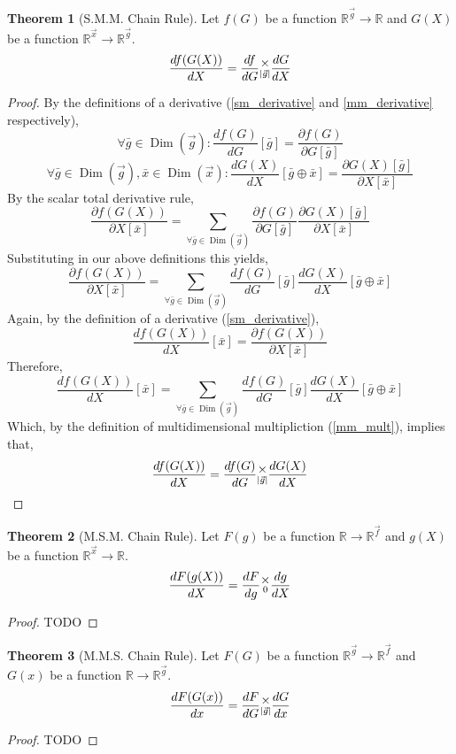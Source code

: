 \documentclass[12pt]{article}
\theoremstyle{definition}
\newtheorem{theorem}{Theorem}[section]
\theoremstyle{case}
\theoremstyle{ppart}
\DeclareMathOperator{\Dim}{Dim}
\newcommand{\mmult}[1]{\text{\raisebox{1ex}{$\underset{#1}{\times}$}}}
\begin{document}
\begin{theorem}[S.M.M. Chain Rule]
\label{smm_chain_rule}
Let $f(G)$ be a function $\mathbb{R}^{\vec{g}} \rightarrow \mathbb{R}$
and $G(X)$ be a function $\mathbb{R}^{\vec{x}} \rightarrow \mathbb{R}^{\vec{g}}$.
\[
\frac{df(G(X))}{dX} = \frac{df}{dG} \mmult{|\vec{g}|} \frac{dG}{dX}
\]
\end{theorem}
\begin{proof}
By the definitions of a derivative
(\ref{sm_derivative} and \ref{mm_derivative} respectively),
\[
\forall \bar{g} \in \Dim(\vec{g}):
\frac{df(G)}{dG}[\bar{g}]
= \frac{\partial f(G)}{\partial G[\bar{g}]}
\]
\[
\forall \bar{g} \in \Dim(\vec{g}), \bar{x} \in \Dim(\vec{x}):
\frac{dG(X)}{dX}[\bar{g} \oplus \bar{x}]
= \frac{\partial G(X)[\bar{g}]}{\partial X[\bar{x}]}
\]
By the scalar total derivative rule,
\[
\frac{\partial f(G(X))}{\partial X[\bar{x}]}
= \sum_{\forall \bar{g} \in \Dim(\vec{g})} 
\frac{\partial f(G)}{\partial G[\bar{g}]}
\frac{\partial G(X)[\bar{g}]}{\partial X[\bar{x}]}
\]
Substituting in our above definitions this yields,
\[
\frac{\partial f(G(X))}{\partial X[\bar{x}]}
= \sum_{\forall \bar{g} \in \Dim(\vec{g})} 
\frac{df(G)}{dG}[\bar{g}]
\frac{dG(X)}{dX}[\bar{g} \oplus \bar{x}]
\]
Again, by the definition of a derivative (\ref{sm_derivative}),
\[
\frac{df(G(X))}{dX}[\bar{x}] =
\frac{\partial f(G(X))}{\partial X[\bar{x}]}
\]
Therefore,
\[
\frac{df(G(X))}{dX}[\bar{x}]
= \sum_{\forall \bar{g} \in \Dim(\vec{g})} 
\frac{df(G)}{dG}[\bar{g}]
\frac{dG(X)}{dX}[\bar{g} \oplus \bar{x}]
\]
Which, by the definition of multidimensional multipliction (\ref{mm_mult}),
implies that,
\[
\frac{df(G(X))}{dX} = \frac{df(G)}{dG} \mmult{|\vec{g}|} \frac{dG(X)}{dX}
\]
\end{proof}

\begin{theorem}[M.S.M. Chain Rule]
\label{msm_chain_rule}
Let $F(g)$ be a function $\mathbb{R} \rightarrow \mathbb{R}^{\vec{f}}$
and $g(X)$ be a function $\mathbb{R}^{\vec{x}} \rightarrow \mathbb{R}$.
\[
\frac{dF(g(X))}{dX} = \frac{dF}{dg} \mmult{0} \frac{dg}{dX}
\]
\end{theorem}
\begin{proof}
TODO
\end{proof}

\begin{theorem}[M.M.S. Chain Rule]
\label{mms_chain_rule}
Let $F(G)$ be a function $\mathbb{R}^{\vec{g}} \rightarrow \mathbb{R}^{\vec{f}}$
and $G(x)$ be a function $\mathbb{R} \rightarrow \mathbb{R}^{\vec{g}}$.
\[
\frac{dF(G(x))}{dx} = \frac{dF}{dG} \mmult{|\vec{g}|} \frac{dG}{dx}
\]
\end{theorem}
\begin{proof}
TODO
\end{proof}
\end{document}
